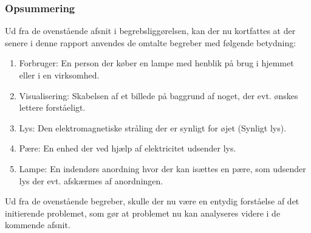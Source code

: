 \subsubsection{Opsummering}
Ud fra de ovenstående afsnit i begrebsliggørelsen, kan der nu kortfattes at der senere i denne rapport anvendes de omtalte begreber med følgende betydning:
\begin{enumerate}
	\item Forbruger: En person der køber en lampe med henblik på brug i hjemmet eller i en virksomhed.
	\item Visualisering: Skabelsen af et billede på baggrund af noget, der evt. ønskes lettere forståeligt.
	\item Lys: Den elektromagnetiske stråling der er synligt for øjet (Synligt lys).
	\item Pære: En enhed der ved hjælp af elektricitet udsender lys.
	\item Lampe: En indendørs anordning hvor der kan isættes en pære, som udsender lys der evt. afskærmes af anordningen.
\end{enumerate}
Ud fra de ovenstående begreber, skulle der nu være en entydig forståelse af det initierende problemet, som gør at problemet nu kan analyseres videre i de kommende afsnit.





